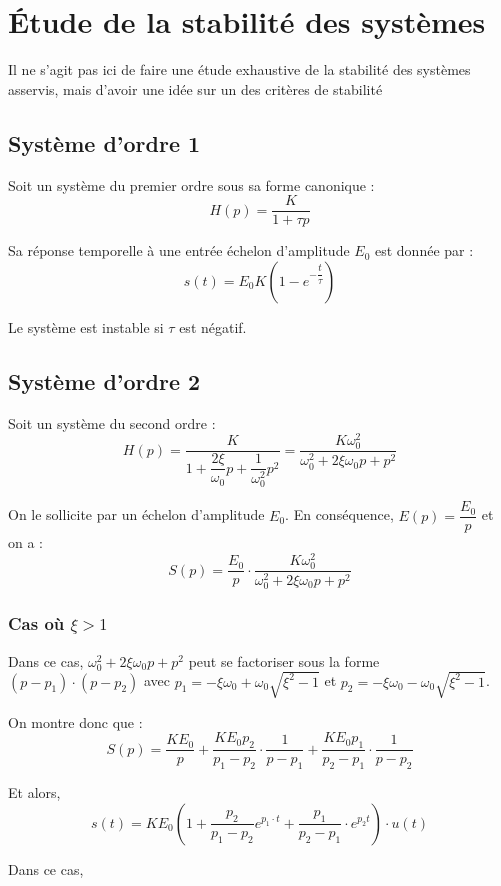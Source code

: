 \documentclass[10pt,fleqn]{article} %
\begin{document}
\section{Étude de la stabilité des systèmes}
Il ne s'agit pas ici de faire une étude exhaustive de la stabilité des systèmes asservis, mais d'avoir une idée sur un des critères de stabilité
\subsection{Système d'ordre 1}
Soit un système du premier ordre sous sa forme canonique :
$$
H(p)=\dfrac{K}{1+\tau p}
$$

Sa réponse temporelle à une entrée échelon d'amplitude $E_0$ est donnée par :
$$
s(t) = E_0 K \left(1-e^{-\dfrac{t}{\tau}}\right)
$$

Le système est instable si $\tau$ est négatif.

\subsection{Système d'ordre 2}
Soit un système du second ordre :
$$
H(p)
=\dfrac{K}{1+\dfrac{2\xi}{\omega_0} p+\dfrac{1}{\omega_0^2} p^2}
=\dfrac{K\omega_0^2}{\omega_0^2+2\xi\omega_0 p+ p^2}
$$


On le sollicite par un échelon d'amplitude $E_0$. En conséquence, $E(p)=\dfrac{E_0}{p}$ et on a :
$$
S(p)=\dfrac{E_0}{p} \cdot \dfrac{K\omega_0^2}{\omega_0^2+2\xi\omega_0 p+ p^2}
$$

\subsubsection{Cas où $\xi>1$}
Dans ce cas, $\omega_0^2+2\xi\omega_0 p+ p^2$ peut se factoriser sous la forme $\left(p-p_1\right)\cdot\left(p-p_2\right)$ avec $p_1 = -\xi\omega_0 + \omega_0 \sqrt{\xi^2-1}$ et $p_2 = -\xi\omega_0 - \omega_0 \sqrt{\xi^2-1}$.

On montre donc que :
$$
S(p)= \dfrac{KE_0}{p} + \dfrac{KE_0 p_2}{p_1-p_2}\cdot \dfrac{1}{p-p_1}
+ \dfrac{KE_0 p_1}{p_2-p_1}\cdot \dfrac{1}{p-p_2}
$$

Et alors, 
$$
s(t) = KE_0\left(1+ \dfrac{ p_2}{p_1-p_2} e^{p_1 \cdot t} + \dfrac{p_1}{p_2-p_1}\cdot e^{p_2 t} \right) \cdot u(t)
$$


Dans ce cas, 
\end{document}
